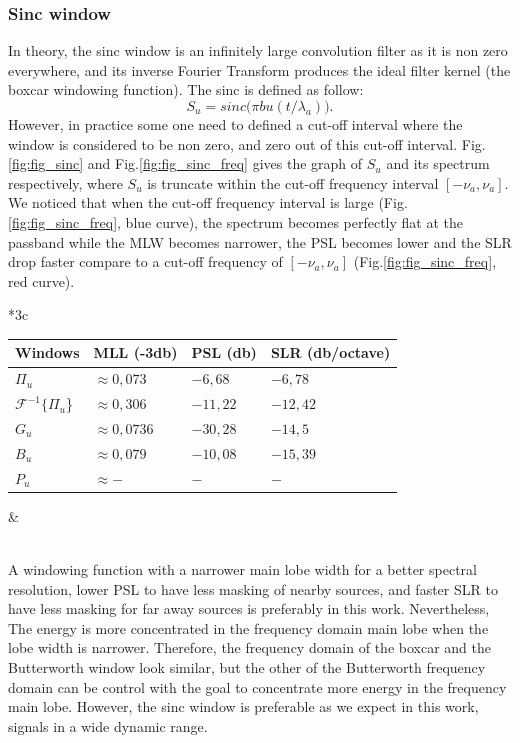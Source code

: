 \documentclass[useAMS,usenatbib]{mn2e}
\begin{document}
\subsubsection{Sinc window}
In theory, the sinc window  is an infinitely large convolution filter as it is non zero everywhere, and its inverse Fourier
Transform produces the ideal filter kernel (the boxcar windowing function). The sinc is defined as follow:
\begin{equation}
S_u= sinc\big(\pi bu(t/\lambda_a)\big).
\end{equation}
However, in practice some one need to defined a cut-off interval where the window is considered to be non zero, and zero out of this 
cut-off interval. Fig.\ref{fig:fig_sinc} and Fig.\ref{fig:fig_sinc_freq} gives the graph of $S_{u}$ and its spectrum respectively, where 
$S_{u}$ is truncate within the cut-off frequency interval $[-\nu_a,\nu_a]$. We noticed that when the cut-off frequency interval is large 
(Fig.\ref{fig:fig_sinc_freq}, blue curve), the spectrum becomes perfectly flat at the passband while the MLW becomes narrower,  the PSL 
becomes lower and the SLR drop faster compare to a cut-off frequency of $[-\nu_a,\nu_a]$ (Fig.\ref{fig:fig_sinc_freq}, red curve). \\
\begin{tabular}{*3{c}}
 \\
 \begin{tabular}{|l|l|l|l|}
  \footnotesize Windows &\textbf{\footnotesize MLL (-3db)}&\textbf{\footnotesize PSL (db)} &\textbf{\footnotesize SLR (db/octave) }  \\
  \hline\hline
  {\footnotesize $\Pi_{u}$} &{\footnotesize $\approx 0,073$} &{\footnotesize $-6,68$}&{\footnotesize $-6,78$}\\
  {\footnotesize $\mathcal{F}^{-1}\{\Pi_{u}$\}} &{\footnotesize  $\approx0,306$}&{\footnotesize  $-11,22$}&{\footnotesize  $-12,42$} \\
  {\footnotesize $G_{u}$} & {\footnotesize $\approx0,0736$}&{\footnotesize  $-30,28$}&{\footnotesize  $-14,5$}\\ 
  {\footnotesize $B_{u}$} &{\footnotesize  $\approx0,079$} &{\footnotesize $-10,08$ }&{\footnotesize  $-15,39$}\\
  {\footnotesize $P_{u}$} &{\footnotesize  $\approx- $} &{\footnotesize $ -$ }&{\footnotesize  $ -$}
  \end{tabular}& \label{BDWBnoise}
\end{tabular}\\
A windowing function with a narrower main lobe width for a better spectral resolution, lower PSL to have less
masking of nearby sources, and faster SLR to have less masking for far away sources  is preferably in this work. 
Nevertheless, The energy is more concentrated in the frequency domain main lobe when the  lobe width is narrower. Therefore, the frequency 
domain of the boxcar  and the Butterworth window look similar, but the other of the Butterworth frequency domain can be control with the 
goal to concentrate more energy in the frequency main lobe. However, the  sinc window is preferable as we expect in this work, signals in a 
wide dynamic range.
\end{document}
